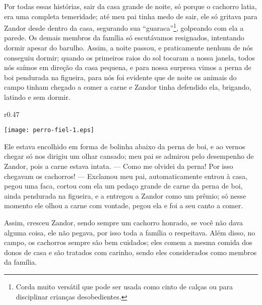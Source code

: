 Por todas essas histórias, sair da casa grande de noite, só porque o cachorro latia, era uma completa temeridade; até meu pai tinha medo de sair, ele só gritava para Zandor desde dentro da casa, segurando sua ``guaraca''\footnote{Corda muito versátil que pode ser usada como cinto de calças ou para disciplinar crianças desobedientes.}, golpeando com ela a parede. 
Os demais membros da família só escutávamos resignados, intentando dormir apesar do barulho.
Assim, a noite passou, e praticamente nenhum de nós conseguiu dormir; quando os primeiros raios do sol tocaram a nossa janela, todos nós saímos em direção da casa pequena, e para nossa surpresa vimos a perna de boi pendurada na figueira, para nós foi evidente que de noite os animais do campo tinham chegado a comer a carne e Zandor tinha defendido ela, brigando, latindo e sem dormir. 
\begin{wrapfigure}{r}{0.47\textwidth}
  \begin{center}
  \vspace{-0.5cm}
    \texttt{[image: perro-fiel-1.eps]}
  \end{center}
  \vspace{-0.5cm}
\end{wrapfigure}
Ele estava encolhido em forma de bolinha abaixo da perna de boi, e ao vernos chegar só nos dirigiu um olhar cansado; meu pai se admirou pelo desempenho de Zandor, pois a carne estava intata. --- Como me olvidei da perna! Por isso chegavam os cachorros! --- 
Exclamou meu pai, automaticamente entrou à casa, pegou uma faca, cortou com ela um pedaço grande de carne da perna de boi, ainda pendurada na figueira, e a entregou a Zandor como um prêmio; só nesse momento ele olhou a carne com vontade, pegou ela e foi a seu canto a comer.

Assim, cresceu Zandor, sendo sempre um cachorro honrado, se você não dava alguma coisa, ele não pegava, por isso toda a família o respeitava. Além disso, no campo, os cachorros sempre são bem cuidados; eles comem a mesma comida dos donos de casa e são tratados com carinho, sendo eles considerados como membros da família.

